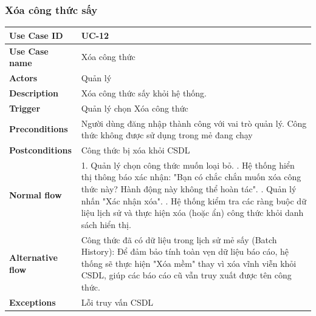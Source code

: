 \subsubsection{Xóa công thức sấy}
\begin{tabular}{|p{3.5cm}|p{9.5cm}|}
\hline
\textbf{Use Case ID} & UC-12 \\
\hline
\textbf{Use Case name} & Xóa công thức \\
\hline
\textbf{Actors} & Quản lý \\
\hline
\textbf{Description} & 
Xóa công thức sấy khỏi hệ thống. \\
\hline
\textbf{Trigger} & Quản lý chọn Xóa công thức\\
\hline
\textbf{Preconditions} & Người dùng đăng nhập thành công với vai trò quản lý. Công thức không được sử dụng trong mẻ đang chạy \\
\hline
\textbf{Postconditions} & Công thức bị xóa khỏi CSDL \\
\hline
\textbf{Normal flow} & 
1. Quản lý chọn công thức muốn loại bỏ. \newline
2. Hệ thống hiển thị thông báo xác nhận: "Bạn có chắc chắn muốn xóa công thức này? Hành động này không thể hoàn tác". \newline
3. Quản lý nhấn "Xác nhận xóa". \newline
4. Hệ thống kiểm tra các ràng buộc dữ liệu lịch sử và thực hiện xóa (hoặc ẩn) công thức khỏi danh sách hiển thị. \\
\hline
\textbf{Alternative flow} & 
Công thức đã có dữ liệu trong lịch sử mẻ sấy (Batch History): Để đảm bảo tính toàn vẹn dữ liệu báo cáo, hệ thống sẽ thực hiện "Xóa mềm" thay vì xóa vĩnh viễn khỏi CSDL, giúp các báo cáo cũ vẫn truy xuất được tên công thức. \\
\hline
\textbf{Exceptions} & Lỗi truy vấn CSDL \\
\hline
\end{tabular}

